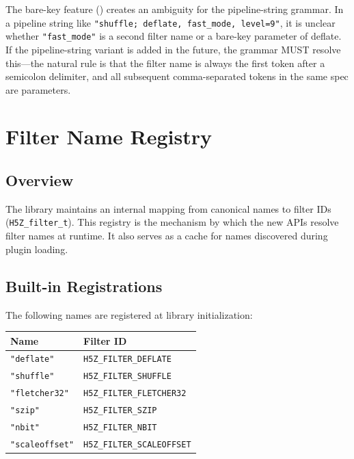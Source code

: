\documentclass[../HDF5_RFC.tex]{subfiles}
\begin{document}
The bare-key feature () creates an
ambiguity for the pipeline-string grammar. In a pipeline string like
\texttt{"shuffle; deflate, fast\_mode, level=9"}, it is unclear whether
\texttt{"fast\_mode"} is a second filter name or a bare-key parameter of deflate. If
the pipeline-string variant is added in the future, the grammar MUST resolve
this---the natural rule is that the filter name is always the first token
after a semicolon delimiter, and all subsequent comma-separated tokens in the
same spec are parameters.


\section{Filter Name Registry}
\label{sec:name-registry}

\subsection{Overview}

The library maintains an internal mapping from canonical names to filter IDs
(\texttt{H5Z\_filter\_t}). This registry is the mechanism by which the new APIs resolve
filter names at runtime. It also serves as a cache for names discovered during
plugin loading.

\subsection{Built-in Registrations}

The following names are registered at library initialization:

\begin{center}
\begin{tabular}{ll}
\toprule
\textbf{Name} & \textbf{Filter ID} \\
\midrule
\texttt{"deflate"}     & \texttt{H5Z\_FILTER\_DEFLATE} \\
\texttt{"shuffle"}     & \texttt{H5Z\_FILTER\_SHUFFLE} \\
\texttt{"fletcher32"}  & \texttt{H5Z\_FILTER\_FLETCHER32} \\
\texttt{"szip"}        & \texttt{H5Z\_FILTER\_SZIP} \\
\texttt{"nbit"}        & \texttt{H5Z\_FILTER\_NBIT} \\
\texttt{"scaleoffset"} & \texttt{H5Z\_FILTER\_SCALEOFFSET} \\
\bottomrule
\end{tabular}
\end{center}
\end{document}
